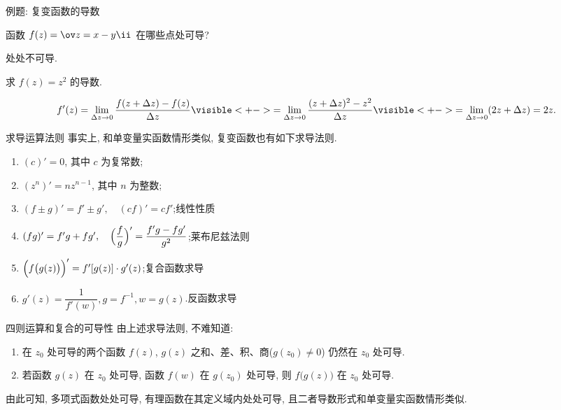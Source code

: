 \begin{frame}{例题: 复变函数的导数}
	\onslide<+->
	\begin{exercise}[nearnext]
		函数 $f(z)=\ov z=x-y\ii$ 在哪些点处可导? 
	\end{exercise}
	\onslide<+->
	\begin{answer}[nearprev]
		处处不可导.
	\end{answer}
	\onslide<+->
	\begin{example}[nearnext]
		求 $f(z)=z^2$ 的导数.
	\end{example}
	\onslide<+->
	\begin{solution}[nearprev]
		\bigdel
		\[
			f'(z)=\lim_{\Delta z\to 0}\frac{f(z+\Delta z)-f(z)}{\Delta z}
			\visible<+->{=\lim_{\Delta z\to 0}\frac{(z+\Delta z)^2-z^2}{\Delta z}}
			\visible<+->{=\lim_{\Delta z\to 0}(2z+\Delta z)=2z.}
		\]\bigdel
	\end{solution}
\end{frame}


\begin{frame}{求导运算法则}
	\onslide<+->
	事实上, 和单变量实函数情形类似, 复变函数也有如下求导法则.
	\onslide<+->
	\begin{theorem}
		\begin{enumerate}
			\item $(c)'=0$, 其中 $c$ 为复常数;
			\item $(z^n)'=nz^{n-1}$, 其中 $n$ 为整数;
			\item $(f\pm g)'=f'\pm g',\quad (cf)'=cf'$;\hfill\alert{线性性质}
			\item $(fg)'=f'g+fg',\quad \Bigl(\dfrac fg\Bigr)'=\dfrac{f'g-fg'}{g^2}$;\hfill\alert{莱布尼兹法则}
			\item $\Bigl(f\bigl(g(z)\bigr)\Bigr)'=f'[g(z)]\cdot g'(z)$;\hfill\alert{复合函数求导}
			\item $g'(z)=\dfrac1{f'(w)}, g=f^{-1}, w=g(z)$.\hfill\alert{反函数求导}
		\end{enumerate}
	\end{theorem}
\end{frame}


\begin{frame}{四则运算和复合的可导性}
	\onslide<+->
	由上述求导法则, 不难知道:
	\onslide<+->
	\begin{theorem}
		\begin{enumerate}
			\item 在 $z_0$ 处可导的两个函数 $f(z)$, $g(z)$ 之和、差、积、商($g(z_0)\neq 0$) 仍然在 $z_0$ 处可导.
			\item 若函数 $g(z)$ 在 $z_0$ 处可导, 函数 $f(w)$ 在 $g(z_0)$ 处可导, 则 $f\bigl(g(z)\bigr)$ 在 $z_0$ 处可导.
		\end{enumerate}
	\end{theorem}
	\onslide<+->
	由此可知, 多项式函数处处可导, 有理函数在其定义域内处处可导, 且二者导数形式和单变量实函数情形类似.
\end{frame}


